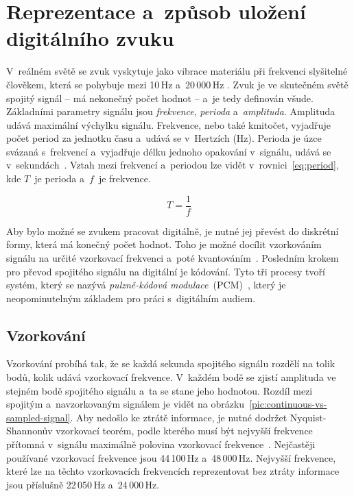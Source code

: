 \section{Reprezentace a~způsob uložení digitálního zvuku}
\label{sec:digital-sound-representation}

V~reálném světě se zvuk vyskytuje jako vibrace materiálu při frekvenci
slyšitelné člověkem, která se pohybuje mezi 10\,Hz a~20\,000\,Hz
\cite{Swanson1998}. Zvuk je ve skutečném světě spojitý signál -- má nekonečný
počet hodnot -- a~je tedy definován všude. Základními parametry signálu jsou
\textit{frekvence}, \textit{perioda} a~\textit{amplituda}. Amplituda udává
maximální výchylku signálu. Frekvence, nebo také kmitočet, vyjadřuje počet
period za jednotku času a~udává se v~Hertzích (Hz). Perioda je úzce svázaná
s~frekvencí a~vyjadřuje délku jednoho opakování v~signálu, udává se
v~sekundách~\cite{Cernocky2021}. Vztah mezi frekvencí a~periodou lze vidět
v~rovnici~\ref{eq:period}, kde $T$~je perioda a~$f$~je frekvence.

\begin{equation}
    \label{eq:period}
    T = \frac{1}{f}
\end{equation}

Aby bylo možné se zvukem pracovat
digitálně, je nutné jej převést do diskrétní formy, která má konečný počet
hodnot. Toho je možné docílit vzorkováním signálu na určité vzorkovací
frekvenci a~poté kvantováním~\cite{Cernocky2021}. Posledním krokem pro převod
spojitého signálu na digitální je kódování. Tyto tři procesy tvoří systém,
který se nazývá \textit{pulzně-kódová modulace}~(PCM)~\cite{Oliver1948}, který
je neopominutelným základem pro práci s~digitálním audiem.

\subsection*{Vzorkování}
\label{sub:sampling}

Vzorkování probíhá tak, že se každá sekunda spojitého signálu rozdělí na tolik
bodů, kolik udává vzorkovací frekvence. V~každém bodě se zjistí amplituda ve
stejném bodě spojitého signálu a~ta se stane jeho hodnotou. Rozdíl mezi
spojitým a~navzorkovaným signálem je vidět na
obrázku~\ref{pic:continuous-vs-sampled-signal}. Aby nedošlo ke ztrátě
informace, je nutné dodržet Nyquist-Shannonův vzorkovací teorém, podle kterého
musí být nejvyšší frekvence přítomná v~signálu maximálně polovina vzorkovací
frekvence~\cite{Shannon1949}. Nejčastěji používané vzorkovací frekvence jsou
44\,100\,Hz a~48\,000\,Hz. Nejvyšší frekvence, které lze na těchto vzorkovacích
frekvencích reprezentovat bez ztráty informace jsou příslušně 22\,050\,Hz
a~24\,000\,Hz.

